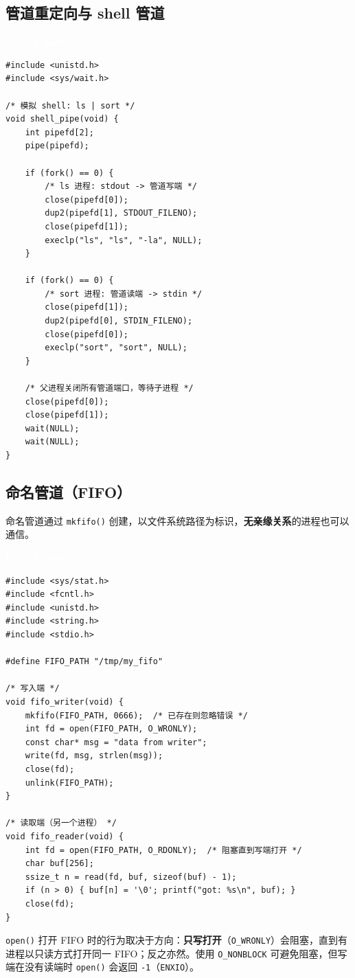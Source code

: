 \documentclass[12pt,a4paper,fontset=fandol]{ctexbook}
\newcommand{\Tp}[1]{\texttt{#1}}
\newcommand{\posixlabel}{%
  \noindent\begin{tcolorbox}[sharp corners,colback=posixheadbg,colframe=posixheadbg,
    left=6pt,right=6pt,top=2pt,bottom=2pt,boxrule=0pt]
  \textcolor{white}{\small\bfseries\sffamily POSIX Sockets}\end{tcolorbox}%
}
\begin{document}
\subsection{管道重定向与 shell 管道}

\posixlabel
\begin{lstlisting}[style=cstyle]
#include <unistd.h>
#include <sys/wait.h>

/* 模拟 shell: ls | sort */
void shell_pipe(void) {
    int pipefd[2];
    pipe(pipefd);

    if (fork() == 0) {
        /* ls 进程: stdout -> 管道写端 */
        close(pipefd[0]);
        dup2(pipefd[1], STDOUT_FILENO);
        close(pipefd[1]);
        execlp("ls", "ls", "-la", NULL);
    }

    if (fork() == 0) {
        /* sort 进程: 管道读端 -> stdin */
        close(pipefd[1]);
        dup2(pipefd[0], STDIN_FILENO);
        close(pipefd[0]);
        execlp("sort", "sort", NULL);
    }

    /* 父进程关闭所有管道端口，等待子进程 */
    close(pipefd[0]);
    close(pipefd[1]);
    wait(NULL);
    wait(NULL);
}
\end{lstlisting}

\subsection{命名管道（FIFO）}

命名管道通过 \Tp{mkfifo()} 创建，以文件系统路径为标识，\textbf{无亲缘关系}的进程也可以通信。

\posixlabel
\begin{lstlisting}[style=cstyle]
#include <sys/stat.h>
#include <fcntl.h>
#include <unistd.h>
#include <string.h>
#include <stdio.h>

#define FIFO_PATH "/tmp/my_fifo"

/* 写入端 */
void fifo_writer(void) {
    mkfifo(FIFO_PATH, 0666);  /* 已存在则忽略错误 */
    int fd = open(FIFO_PATH, O_WRONLY);
    const char* msg = "data from writer";
    write(fd, msg, strlen(msg));
    close(fd);
    unlink(FIFO_PATH);
}

/* 读取端（另一个进程） */
void fifo_reader(void) {
    int fd = open(FIFO_PATH, O_RDONLY);  /* 阻塞直到写端打开 */
    char buf[256];
    ssize_t n = read(fd, buf, sizeof(buf) - 1);
    if (n > 0) { buf[n] = '\0'; printf("got: %s\n", buf); }
    close(fd);
}
\end{lstlisting}

\begin{warning}[title=FIFO 打开语义]
\Tp{open()} 打开 FIFO 时的行为取决于方向：\textbf{只写打开}（\Tp{O\_WRONLY}）会阻塞，直到有进程以只读方式打开同一 FIFO；反之亦然。使用 \Tp{O\_NONBLOCK} 可避免阻塞，但写端在没有读端时 \Tp{open()} 会返回 \Tp{-1}（\Tp{ENXIO}）。
\end{warning}
\end{document}
